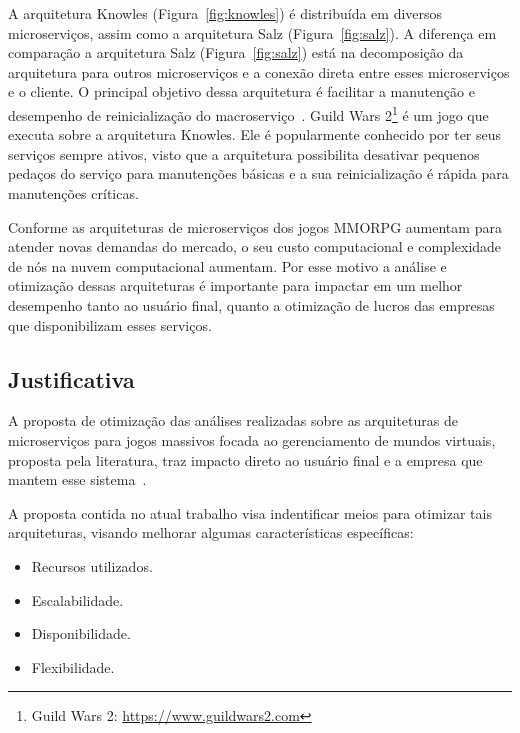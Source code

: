 A arquitetura Knowles (Figura~\ref{fig:knowles}) é distribuída em diversos microserviços, assim como a arquitetura Salz (Figura~\ref{fig:salz}).
%
A diferença em comparação a arquitetura Salz (Figura~\ref{fig:salz}) está na decomposição da arquitetura para outros microserviços e a conexão direta entre esses microserviços e o cliente.
%
O principal objetivo dessa arquitetura é facilitar a manutenção e desempenho de reinicialização do macroserviço~\cite{stephenclarkewillson2017}.
%
Guild Wars 2\footnote[3]{Guild Wars 2: \url{https://www.guildwars2.com}} é um jogo que executa sobre a arquitetura Knowles. %
%
Ele é popularmente conhecido por ter seus serviços sempre ativos, visto que a arquitetura possibilita desativar pequenos pedaços do serviço para manutenções básicas e a sua reinicialização é rápida para manutenções críticas.

Conforme as arquiteturas de microserviços dos jogos \ac{MMORPG} aumentam para atender novas demandas do mercado, o seu custo computacional e complexidade de nós na nuvem computacional aumentam.
%
Por esse motivo a análise e otimização dessas arquiteturas é importante para impactar em um melhor desempenho tanto ao usuário final, quanto a otimização de lucros das empresas que disponibilizam esses serviços.

\subsection{Justificativa}

A proposta de otimização das análises realizadas sobre as arquiteturas de microserviços para jogos massivos focada ao gerenciamento de mundos virtuais, proposta pela literatura, traz impacto direto ao usuário final e a empresa que mantem esse sistema~\cite{1417630}.

A proposta contida no atual trabalho visa indentificar meios para otimizar tais arquiteturas, visando melhorar algumas características específicas:

\begin{itemize}
  \item Recursos utilizados.
  \item Escalabilidade.
  \item Disponibilidade.
  \item Flexibilidade.
\end{itemize}
